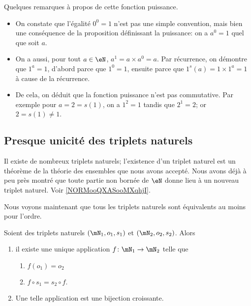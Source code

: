 \begin{remark}	\label{REMooProprietesPuissance}
	Quelques remarques à propos de cette fonction puissance.
 	\begin{itemize}
  		\item
			On constate que l'égalité \( 0^0 = 1 \) n'est pas une simple convention, mais bien une conséquence de la proposition définissant la puissance: on a \( a^0 = 1 \) quel que soit \( a \).
   		\item
	 		On a aussi, pour tout \( a \in \eN \), \( a^1 = a \times a^0 = a \). Par récurrence, on démontre que \( 1^a = 1 \), d'abord parce que \( 1^0 = 1 \), ensuite parce que \( 1^s(a) = 1 \times 1^a = 1 \) à cause de la récurrence.
		\item
  			De cela, on déduit que la fonction puissance n'est pas commutative. Par exemple pour \( a = 2 = s(1) \), on a \( 1^2 = 1 \) tandis que \( 2^1 = 2 \); or \( 2 = s(1) \neq 1 \).
	 \end{itemize}
\end{remark}


\subsection{Presque unicité des triplets naturels}
\label{SUBooUniciteTripletsNaturels}

\begin{normaltext}	\label{NORooIntroUniciteTripletsNaturels}
	Il existe de nombreux triplets naturels; l'existence d'un triplet naturel est un théorème de la théorie des ensembles que nous avons accepté. Nous avons déjà à peu près montré que toute partie non bornée de \( \eN\) donne lieu à un nouveau triplet naturel. Voir \ref{NORMooQXASooMXqhjI}.

	Nous voyons maintenant que tous les triplets naturels sont équivalents au moins pour l'ordre.
\end{normaltext}

\begin{theorem}     \label{THOooFUXMooJuigHK}
	Soient des triplets naturels \( (\mN_1,o_1,s_1)\) et \( (\mN_2,o_2,s_2)\). Alors
	\begin{enumerate}
		\item
		      il existe une unique application \( f\colon \mN_1\to \mN_2\) telle que
		      \begin{enumerate}
			      \item
			            \( f(o_1)=o_2\)
			      \item
			            \( f\circ s_1=s_2\circ f\).
		      \end{enumerate}
		\item
		      Une telle application est une bijection croissante.
	\end{enumerate}
\end{theorem}

